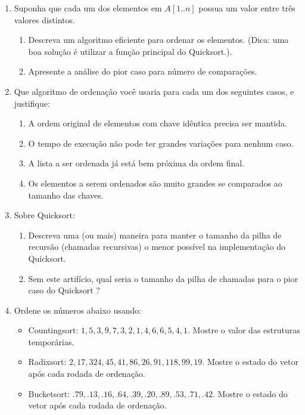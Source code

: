 \begin{enumerate}
\item Suponha que cada um dos elementos em $A[1..n]$ possua um valor entre três valores
distintos.
	\begin{enumerate}
	\item Descreva um algoritmo eficiente para ordenar os elementos. (Dica: uma boa
		solução é utilizar a função principal do Quicksort.).
	\item Apresente a análise do pior caso para número de comparações.
	\end{enumerate}

\item Que algoritmo de ordenação você usaria para cada um dos seguintes casos, e justifique:
	\begin{enumerate}
	\item A ordem original de elementos com chave idêntica precisa ser mantida.
	\item O tempo de execução não pode ter grandes variações para nenhum caso.
	\item A lista a ser ordenada já está bem próxima da ordem final.
	\item Os elementos a serem ordenados são muito grandes se comparados ao tamanho
		das chaves.
	\end{enumerate}
	
\item Sobre Quicksort:
	\begin{enumerate}
	\item Descreva uma (ou mais) maneira para manter o tamanho da pilha de recursão 
		(chamadas recursivas) o menor possível na implementação do
		Quicksort.
	\item Sem este artifício, qual seria o tamanho da pilha de chamadas para o
	pior caso do Quicksort ?
	\end{enumerate}
	

\item Ordene os números abaixo usando:
	\begin{itemize}
	\item Countingsort: $1, 5, 3, 9, 7, 3, 2, 1, 4, 6, 6, 5, 4, 1$. Mostre o valor das estruturas temporárias.
	\item Radixsort: $2, 17, 324, 45, 41, 86, 26, 91, 118, 99, 19$. Mostre o estado do vetor após cada rodada de ordenação.
	\item Bucketsort: $.79, .13, .16, .64, .39, .20, .89, .53, .71, .42$. Mostre o estado do vetor após cada rodada de ordenação.
	\end{itemize}

\end{enumerate}

